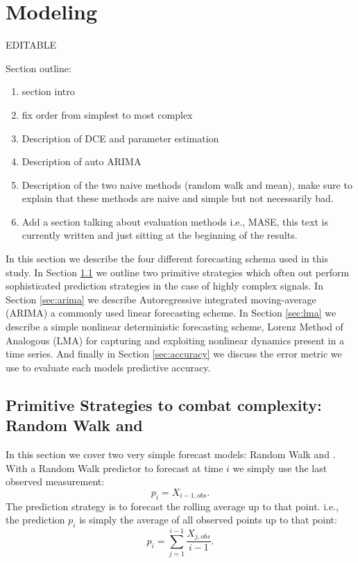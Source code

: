 \section{Modeling }\label{sec:model}
{\color{blue} EDITABLE}

Section outline:

\begin{enumerate}
\item \cmark section intro
\item \cmark fix order from simplest to most complex
\item Description of DCE and parameter estimation  
\item\cmark Description of auto ARIMA 
\item \cmark Description of the two naive methods (random walk and mean), make sure to explain that these methods are naive and simple but not necessarily bad.
\item\cmark Add a section talking about evaluation methods i.e., MASE, this text is currently written and just sitting at the beginning of the results. 

\end{enumerate}

In this section we describe the four different forecasting schema used in this study. In Section \ref{sec:simple} we outline two primitive strategies which often out perform sophisticated prediction strategies in the case of highly complex signals. In Section \ref{sec:arima} we describe Autoregressive integrated moving-average (ARIMA) a commonly used linear forecasting scheme. In Section \ref{sec:lma} we describe a simple nonlinear deterministic forecasting scheme, Lorenz Method of Analogous (LMA) for capturing and exploiting nonlinear dynamics present in a time series. And finally in Section \ref{sec:accuracy} we discuss the error metric we use to evaluate each models predictive accuracy.



\subsection{Primitive Strategies to combat complexity: Random Walk and }\label{sec:simple}
In this section we cover two very simple forecast models: Random Walk and \naive. With a Random Walk predictor to forecast at time $i$ we simply use the last observed measurement: $$p_i = X_{i-1,obs}.$$ The \naive  prediction strategy is to forecast the rolling average up to that point. i.e., the prediction $p_i$ is simply the average of all observed points up to that point: $$p_i = \sum_{j=1}^{i-1}\frac{X_{j,obs}}{i-1}.$$

